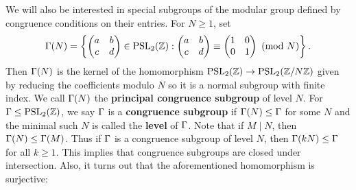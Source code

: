     We will also be interested in special subgroups of the modular group defined by congruence conditions on their entries. For $N \ge 1$, set
    \[
      \Gamma(N) = \left\{\begin{pmatrix} a & b \\ c & d \end{pmatrix} \in \mathrm{PSL}_{2}(\mathbb{Z}):\begin{pmatrix} a & b \\ c & d \end{pmatrix} \equiv \begin{pmatrix} 1 & 0 \\ 0 & 1 \end{pmatrix} \ \left(\text{mod }N\right)\right\}.
    \]
    Then $\Gamma(N)$ is the kernel of the homomorphism $\mathrm{PSL}_{2}(\mathbb{Z}) \to \mathrm{PSL}_{2}(\mathbb{Z}/N\mathbb{Z})$ given by reducing the coefficients modulo $N$ so it is a normal subgroup with finite index. We call $\Gamma(N)$ the \textbf{principal congruence subgroup} of level $N$. For $\Gamma \le \mathrm{PSL}_{2}(\mathbb{Z})$, we say $\Gamma$ is a \textbf{congruence subgroup} if $\Gamma(N) \le \Gamma$ for some $N$ and the minimal such $N$ is called the \textbf{level} of $\Gamma$. Note that if $M \mid N$, then $\Gamma(N) \le \Gamma(M)$. Thus if $\Gamma$ is a congruence subgroup of level $N$, then $\Gamma(kN) \le \Gamma$ for all $k \ge 1$. This implies that congruence subgroups are closed under intersection. Also, it turns out that the aforementioned homomorphism is surjective:


